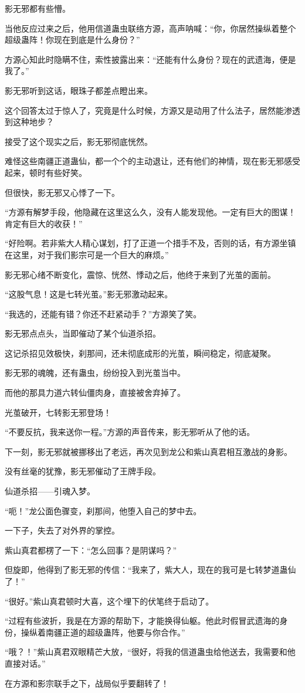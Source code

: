 \begin{this_body}
影无邪都有些懵。

当他反应过来之后，他用信道蛊虫联络方源，高声呐喊：“你，你居然操纵着整个超级蛊阵！你现在到底是什么身份？”

方源心知此时隐瞒不住，索性披露出来：“还能有什么身份？现在的武遗海，便是我了。”

影无邪听到这话，眼珠子都差点瞪出来。

这个回答太过于惊人了，究竟是什么时候，方源又是动用了什么法子，居然能渗透到这种地步？

接受了这个现实之后，影无邪彻底恍然。

难怪这些南疆正道蛊仙，都一个个的主动退让，还有他们的神情，现在影无邪感受起来，顿时有些好笑。

但很快，影无邪又心悸了一下。

“方源有解梦手段，他隐藏在这里这么久，没有人能发现他。一定有巨大的图谋！肯定有巨大的收获！”

“好险啊。若非紫大人精心谋划，打了正道一个措手不及，否则的话，有方源坐镇在这里，对于我们影宗可是一个巨大的麻烦。”

影无邪心绪不断变化，震惊、恍然、悸动之后，他终于来到了光茧的面前。

“这股气息！这是七转光茧。”影无邪激动起来。

“我选的，还能有错？你还不赶紧动手？”方源笑了笑。

影无邪点点头，当即催动了某个仙道杀招。

这记杀招见效极快，刹那间，还未彻底成形的光茧，瞬间稳定，彻底凝聚。

影无邪的魂魄，还有蛊虫，纷纷投入到光茧当中。

而他的那具力道六转仙僵肉身，直接被舍弃掉了。

光茧破开，七转影无邪登场！

“不要反抗，我来送你一程。”方源的声音传来，影无邪听从了他的话。

下一刻，影无邪就被挪移出了老远，再次见到龙公和紫山真君相互激战的身影。

没有丝毫的犹豫，影无邪催动了王牌手段。

仙道杀招——引魂入梦。

“呃！”龙公面色骤变，刹那间，他堕入自己的梦中去。

一下子，失去了对外界的掌控。

紫山真君都楞了一下：“怎么回事？是阴谋吗？”

但旋即，他得到了影无邪的传信：“我来了，紫大人，现在的我可是七转梦道蛊仙了！”

“很好。”紫山真君顿时大喜，这个埋下的伏笔终于启动了。

“过程有些波折，我是在方源的帮助下，才能换得仙躯。他此时假冒武遗海的身份，操纵着南疆正道的超级蛊阵，他要与你合作。”

“哦？！”紫山真君双眼精芒大放，“很好，将我的信道蛊虫给他送去，我需要和他直接对话。”

在方源和影宗联手之下，战局似乎要翻转了！

\end{this_body}


